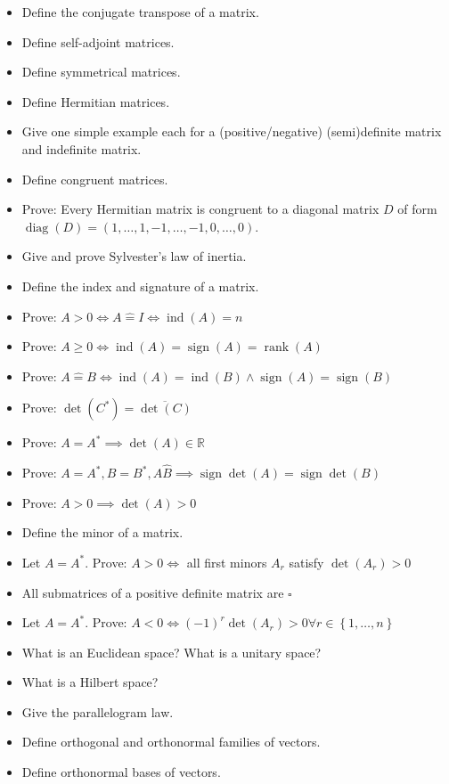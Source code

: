 \documentclass[a4paper]{article}
\newcommand{\set}[1]{\left\{#1\right\}}
\DeclareMathOperator{\sign}{sign}
\begin{document}
\begin{itemize}
  \item Define the conjugate transpose of a matrix.
  \item Define self-adjoint matrices.
  \item Define symmetrical matrices.
  \item Define Hermitian matrices.
  \item Give one simple example each for a (positive/negative) (semi)definite matrix and indefinite matrix.
  \item Define congruent matrices.
  \item Prove: Every Hermitian matrix is congruent to a diagonal matrix $D$ of form $\operatorname{diag}(D) = (1, \dots, 1, -1, \dots, -1, 0, \dots, 0)$.
  \item Give and prove Sylvester's law of inertia.
  \item Define the index and signature of a matrix.
  \item Prove: $A > 0 \iff A \hat={} I \iff \operatorname{ind}(A) = n$
  \item Prove: $A \geq 0 \iff \operatorname{ind}(A) = \operatorname{sign}(A) = \operatorname{rank}(A)$
  \item Prove: $A \hat={} B \iff \operatorname{ind}(A) = \operatorname{ind}(B) \land \operatorname{sign}(A) = \operatorname{sign}(B)$
  \item Prove: $\det(C^*) = \overline{\det(C)}$
  \item Prove: $A = A^* \implies \det(A) \in \mathbb R$
  \item Prove: $A = A^*, B = B^*, A \hat B \implies \sign{\det(A)} = \sign{\det(B)}$
  \item Prove: $A > 0 \implies \det(A) > 0$
  \item Define the minor of a matrix.
  \item Let $A = A^*$. Prove: $A > 0 \iff$ all first minors $A_r$ satisfy $\det(A_r) > 0$
  \item All submatrices of a positive definite matrix are $\square$
  \item Let $A = A^*$. Prove: $A < 0 \iff (-1)^r \det(A_r) > 0 \forall r \in \set{1, \dots, n}$
  \item What is an Euclidean space? What is a unitary space?
  \item What is a Hilbert space?
  \item Give the parallelogram law.
  \item Define orthogonal and orthonormal families of vectors.
  \item Define orthonormal bases of vectors.

\end{itemize}
\end{document}
